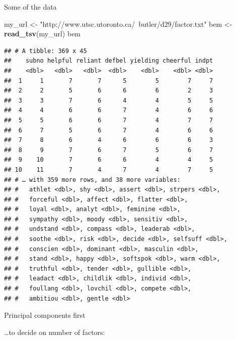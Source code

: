 \documentclass[ignorenonframetext,]{beamer}
\newenvironment{Shaded}{\begin{snugshade}}{\end{snugshade}}
\newcommand{\DataTypeTok}[1]{\textcolor[rgb]{0.13,0.29,0.53}{#1}}
\newcommand{\KeywordTok}[1]{\textcolor[rgb]{0.13,0.29,0.53}{\textbf{#1}}}
\newcommand{\NormalTok}[1]{#1}
\newcommand{\OperatorTok}[1]{\textcolor[rgb]{0.81,0.36,0.00}{\textbf{#1}}}
\newcommand{\StringTok}[1]{\textcolor[rgb]{0.31,0.60,0.02}{#1}}
\begin{document}
\begin{frame}[fragile]{Some of the data}
\protect\hypertarget{some-of-the-data}{}

\begin{Shaded}
\begin{Highlighting}[]
\NormalTok{my_url <-}\StringTok{ "http://www.utsc.utoronto.ca/~butler/d29/factor.txt"}
\NormalTok{bem <-}\StringTok{ }\KeywordTok{read_tsv}\NormalTok{(my_url)}
\NormalTok{bem}
\end{Highlighting}
\end{Shaded}

\begin{verbatim}
## # A tibble: 369 x 45
##    subno helpful reliant defbel yielding cheerful indpt
##    <dbl>   <dbl>   <dbl>  <dbl>    <dbl>    <dbl> <dbl>
##  1     1       7       7      5        5        7     7
##  2     2       5       6      6        6        2     3
##  3     3       7       6      4        4        5     5
##  4     4       6       6      7        4        6     6
##  5     5       6       6      7        4        7     7
##  6     7       5       6      7        4        6     6
##  7     8       6       4      6        6        6     3
##  8     9       7       6      7        5        6     7
##  9    10       7       6      6        4        4     5
## 10    11       7       4      7        4        7     5
## # … with 359 more rows, and 38 more variables:
## #   athlet <dbl>, shy <dbl>, assert <dbl>, strpers <dbl>,
## #   forceful <dbl>, affect <dbl>, flatter <dbl>,
## #   loyal <dbl>, analyt <dbl>, feminine <dbl>,
## #   sympathy <dbl>, moody <dbl>, sensitiv <dbl>,
## #   undstand <dbl>, compass <dbl>, leaderab <dbl>,
## #   soothe <dbl>, risk <dbl>, decide <dbl>, selfsuff <dbl>,
## #   conscien <dbl>, dominant <dbl>, masculin <dbl>,
## #   stand <dbl>, happy <dbl>, softspok <dbl>, warm <dbl>,
## #   truthful <dbl>, tender <dbl>, gullible <dbl>,
## #   leadact <dbl>, childlik <dbl>, individ <dbl>,
## #   foullang <dbl>, lovchil <dbl>, compete <dbl>,
## #   ambitiou <dbl>, gentle <dbl>
\end{verbatim}

\end{frame}

\begin{frame}[fragile]{Principal components first}
\protect\hypertarget{principal-components-first}{}

\ldots to decide on number of factors:

\begin{Shaded}
\end{Shaded}

\end{frame}
\end{document}
